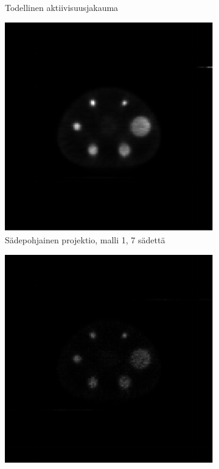 \begin{figure}[H]
\begin{subfigure}[t]{.25\textwidth}
        \caption{Todellinen aktiivisuusjakauma}
    \end{subfigure}%
    \hspace{.075\textwidth}%
    \begin{subfigure}[t]{.25\textwidth}
        \includegraphics[width=\linewidth]{kuvat/nema_rekonstruktio_proj1_malli1_nRay7.pdf}
        \caption{Sädepohjainen projektio, malli 1, 7 sädettä}
    \end{subfigure}
    \begin{subfigure}[b]{.25\textwidth}
        \includegraphics[width=\linewidth]{kuvat/nema_rekonstruktio_proj1_malli2_nRay7.pdf}

\end{subfigure}
\end{figure}
